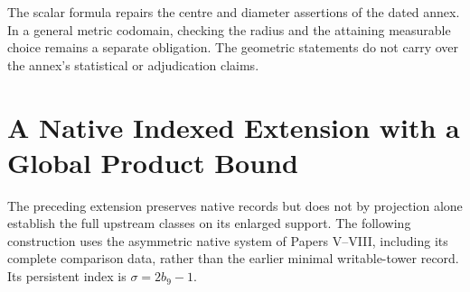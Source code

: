 \documentclass[11pt,a4paper]{article}
\theoremstyle{definition}
\begin{document}
The scalar formula repairs the centre and diameter assertions of the dated annex. In a general metric codomain, checking the radius and the attaining measurable choice remains a separate obligation. The geometric statements do not carry over the annex's statistical or adjudication claims.

\section{A Native Indexed Extension with a Global Product Bound}

The preceding extension preserves native records but does not by projection
alone establish the full upstream classes on its enlarged support. The
following construction uses the asymmetric native system of Papers V--VIII,
including its complete comparison data, rather than the earlier minimal
writable-tower record. Its persistent index is $\sigma=2b_9-1$.
\end{document}
